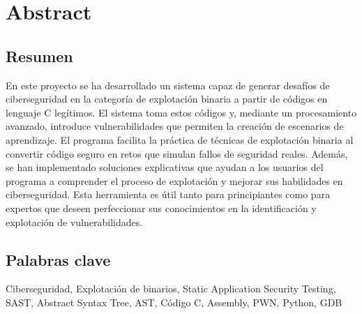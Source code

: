 \chapter*{Abstract}
\section*{Resumen}
En este proyecto se ha desarrollado un sistema capaz de generar desafíos de ciberseguridad en la categoría de explotación binaria a partir de códigos en lenguaje C legítimos.
El sistema toma estos códigos y, mediante un procesamiento avanzado, introduce vulnerabilidades que permiten la creación de escenarios de aprendizaje.
El programa facilita la práctica de técnicas de explotación binaria al convertir código seguro en retos que simulan fallos de seguridad reales.
Además, se han implementado soluciones explicativas que ayudan a los usuarios del programa a comprender el proceso de explotación y mejorar sus habilidades en ciberseguridad.
Esta herramienta es útil tanto para principiantes como para expertos que deseen perfeccionar sus conocimientos en la identificación y explotación de vulnerabilidades.

\section*{Palabras clave}
Ciberseguridad, Explotación de binarios, Static Application Security Testing, SAST, Abstract Syntax Tree, AST, Código C, Assembly, PWN, Python, GDB
